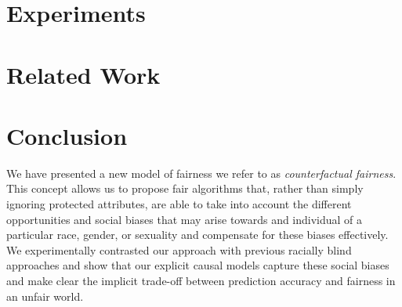 \documentclass{article}
\begin{document}
\section{Experiments}
\label{sec:experiments}


\section{Related Work}
\label{sec:related}


\section{Conclusion}
\label{sec:conclusion}
We have presented a new model of fairness we refer to as {\em
  counterfactual fairness}. This concept allows us to propose fair
algorithms that, rather than simply ignoring protected attributes, are
able to take into account the different opportunities and social biases
that may arise towards and individual of a particular race, gender, or
sexuality and compensate for these biases effectively. We
experimentally contrasted our approach with previous racially blind
approaches and show that our explicit causal models capture these
social biases and make clear the implicit trade-off between
prediction accuracy and fairness in an unfair world.



\end{document}

